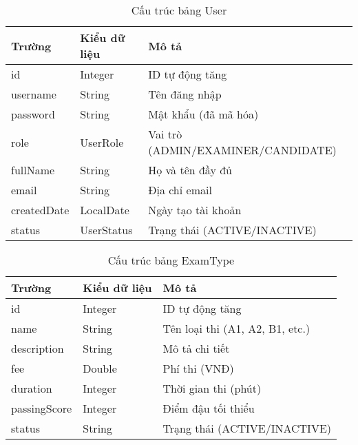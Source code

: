 \documentclass[12pt,a4paper]{article}
\begin{document}
\begin{table}[H]
\centering
\caption{Cấu trúc bảng User}
\label{tab:user_structure}
\begin{tabular}{|l|l|l|}
\hline
\textbf{Trường} & \textbf{Kiểu dữ liệu} & \textbf{Mô tả} \\
\hline
id & Integer & ID tự động tăng \\
\hline
username & String & Tên đăng nhập \\
\hline
password & String & Mật khẩu (đã mã hóa) \\
\hline
role & UserRole & Vai trò (ADMIN/EXAMINER/CANDIDATE) \\
\hline
fullName & String & Họ và tên đầy đủ \\
\hline
email & String & Địa chỉ email \\
\hline
createdDate & LocalDate & Ngày tạo tài khoản \\
\hline
status & UserStatus & Trạng thái (ACTIVE/INACTIVE) \\
\hline
\end{tabular}
\end{table}

\begin{table}[H]
\centering
\caption{Cấu trúc bảng ExamType}
\label{tab:examtype_structure}
\begin{tabular}{|l|l|l|}
\hline
\textbf{Trường} & \textbf{Kiểu dữ liệu} & \textbf{Mô tả} \\
\hline
id & Integer & ID tự động tăng \\
\hline
name & String & Tên loại thi (A1, A2, B1, etc.) \\
\hline
description & String & Mô tả chi tiết \\
\hline
fee & Double & Phí thi (VNĐ) \\
\hline
duration & Integer & Thời gian thi (phút) \\
\hline
passingScore & Integer & Điểm đậu tối thiểu \\
\hline
status & String & Trạng thái (ACTIVE/INACTIVE) \\
\hline
\end{tabular}
\end{table}
\end{document}
